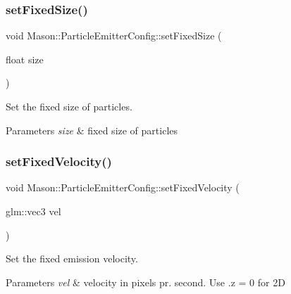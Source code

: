 \subsubsection{\texorpdfstring{set\+Fixed\+Size()}{setFixedSize()}}
{\footnotesize\ttfamily void Mason\+::\+Particle\+Emitter\+Config\+::set\+Fixed\+Size (\begin{DoxyParamCaption}\item[{float}]{size }\end{DoxyParamCaption})\hspace{0.3cm}{\ttfamily [inline]}}



Set the fixed size of particles. 


\begin{DoxyParams}{Parameters}
{\em size} & fixed size of particles \\
\hline
\end{DoxyParams}
\hypertarget{struct_mason_1_1_particle_emitter_config_a63a5b2c01c1f4cc0eaa1e8d4b9226146}{}\label{struct_mason_1_1_particle_emitter_config_a63a5b2c01c1f4cc0eaa1e8d4b9226146} 
\subsubsection{\texorpdfstring{set\+Fixed\+Velocity()}{setFixedVelocity()}}
{\footnotesize\ttfamily void Mason\+::\+Particle\+Emitter\+Config\+::set\+Fixed\+Velocity (\begin{DoxyParamCaption}\item[{glm\+::vec3}]{vel }\end{DoxyParamCaption})\hspace{0.3cm}{\ttfamily [inline]}}



Set the fixed emission velocity. 


\begin{DoxyParams}{Parameters}
{\em vel} & velocity in pixels pr. second. Use .z = 0 for 2D \\
\hline
\end{DoxyParams}
\hypertarget{struct_mason_1_1_particle_emitter_config_ab34a3cc0d4c7252492a261c063b9376b}{}\label{struct_mason_1_1_particle_emitter_config_ab34a3cc0d4c7252492a261c063b9376b} 
